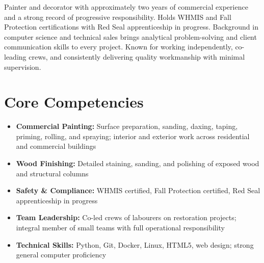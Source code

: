 \documentclass[11pt,letterpaper,sans]{moderncv}
\begin{document}
\makecvtitle


\vspace{6pt}
\small{Painter and decorator with approximately two years of commercial experience and a strong record of progressive responsibility. Holds WHMIS and Fall Protection certifications with Red Seal apprenticeship in progress. Background in computer science and technical sales brings analytical problem-solving and client communication skills to every project. Known for working independently, co-leading crews, and consistently delivering quality workmanship with minimal supervision.}


\section{Core Competencies}
\vspace{1pt}
\begin{itemize}
\item \textbf{Commercial Painting:} Surface preparation, sanding, daxing, taping, priming, rolling, and spraying; interior and exterior work across residential and commercial buildings
\item \textbf{Wood Finishing:} Detailed staining, sanding, and polishing of exposed wood and structural columns
\item \textbf{Safety \& Compliance:} WHMIS certified, Fall Protection certified, Red Seal apprenticeship in progress
\item \textbf{Team Leadership:} Co-led crews of labourers on restoration projects; integral member of small teams with full operational responsibility
\item \textbf{Technical Skills:} Python, Git, Docker, Linux, HTML5, web design; strong general computer proficiency
\end{itemize}

\end{document}
